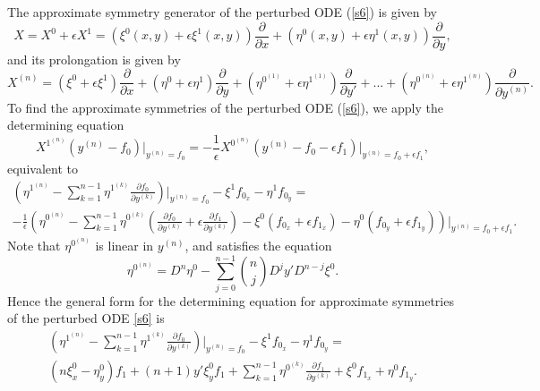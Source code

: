 \documentclass[11pt,letter,subeqn]{article}
\def\beq{\begin{equation}}
\def\eeq{\end{equation}}
\begin{document}
   The approximate symmetry generator of the perturbed ODE (\ref{s6}) is given by
   \beq
    X = X^0+\epsilon X^1=\left(\xi^0(x,y)+\epsilon \xi^1(x,y)\right)\dfrac{\partial}{\partial x}+ \left(\eta^0(x,y)+\epsilon \eta^1(x,y)\right) \dfrac{\partial}{\partial y},
   \eeq
   and its prolongation is given by
   \begin{equation}\label{}
      X^{{(n)}}=\left(\xi^0+\epsilon \xi^1\right)\dfrac{\partial}{\partial x}+ \left(\eta^0+\epsilon \eta^1\right) \dfrac{\partial}{\partial y}+\left(\eta^{0^{(1)}}+ \epsilon \eta^{1^{(1)}}\right)
      \dfrac{\partial}{\partial y'}+...+\left(\eta^{0^{(n)}}+ \epsilon \eta^{1^{(n)}}\right) \dfrac{\partial}{\partial y^{(n)}}.
   \end{equation}
   To find the approximate symmetries of the perturbed ODE (\ref{s6}), we apply the determining equation
   \begin{equation}\label{s7}
     X^{1^{(n)}}(y^{(n)}-f_0)\bigg|_{y^{(n)}=f_0}=-\frac{1}{\epsilon}X^{0^{(n)}}(y^{(n)}-f_0-\epsilon f_1)\bigg|_{y^{(n)}=f_0+\epsilon f_1},
    \end{equation}
equivalent to
\begin{multline}\label{00}
  \left(\eta^{1^{(n)}}-\sum_{k=1}^{n-1} \eta^{1^{(k)}}\frac{\partial f_0}{\partial y^{(k)}}\right)\bigg|_{y^{(n)}=f_0}-\xi^1 f_{0_x}-\eta^1 f_{0_y}=\\
  -\frac{1}{\epsilon}\left(\eta^{0^{(n)}}-\sum_{k=1}^{n-1} \eta^{0^{(k)}}(\frac{\partial f_0}{\partial y^{(k)}}+\epsilon \frac{\partial f_1}{\partial y^{(k)}})-\xi^0
  (f_{0_x}+\epsilon f_{1_x})-\eta^0 (f_{0_y}+\epsilon f_{1_y}) \right)\bigg|_{y^{(n)}=f_0+\epsilon f_1}.
\end{multline}
Note that ${\eta}^{0^{(n)}}$ is linear in $y^{(n)}$, and satisfies the equation
\[
   \eta^{0^{(n)}}= D^n \eta^0 - \sum_{j=0}^{n-1} \binom{n}{j} D^j y' D^{n-j}\xi^0.
\]
Hence the general form for the determining equation for approximate
symmetries of the perturbed ODE  \eqref{s6} is
\begin{multline}\label{000}
    \left(\eta^{1^{(n)}}-\sum_{k=1}^{n-1} \eta^{1^{(k)}}\frac{\partial f_0}{\partial y^{(k)}}\right)\bigg|_{y^{(n)}=f_0}-\xi^1 f_{0_x}-\eta^1
    f_{0_y}=\\(n\xi^0_x-\eta^0_y)f_1+(n+1)y'\xi^0_yf_1+\sum_{k=1}^{n-1} \eta^{0^{(k)}} \frac{\partial f_1}{\partial y^{(k)}}+\xi^0 f_{1_x}+\eta^0 f_{1_y}.
\end{multline}
\end{document}

